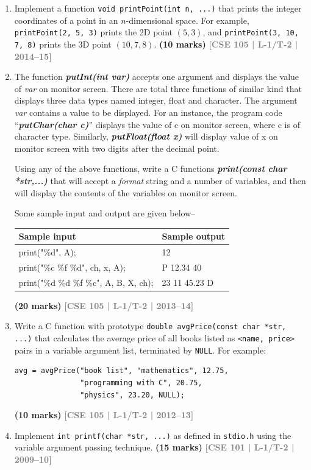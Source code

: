 \documentclass[12pt,a3paper]{article}
\newcommand{\yr}[1]{\hfill\textcolor{gray}{\small\textbf{[#1]}}}
\newcommand{\mk}[1]{\textcolor{orange!70!black}{\small\textbf{(#1 marks)}}}
\begin{document}
\begin{enumerate}
\item Implement a function \texttt{void printPoint(int n, ...)} that prints the integer coordinates of a point in an $n$-dimensional space. For example, \texttt{printPoint(2, 5, 3)} prints the 2D point $(5,3)$, and \texttt{printPoint(3, 10, 7, 8)} prints the 3D point $(10,7,8)$.
\mk{10} \yr{CSE 105 | L-1/T-2 | 2014--15}

\item The function \textbf{\textit{putInt(int var)}} accepts one argument and displays the value of \textit{var} on monitor screen. There are total three functions of similar kind that displays three data types named integer, float and character. The argument \textit{var} contains a value to be displayed. For an instance, the program code ``\textbf{\textit{putChar(char c)}}'' displays the value of c on monitor screen, where c is of character type. Similarly, \textbf{\textit{putFloat(float x)}} will display value of x on monitor screen with two digits after the decimal point.

\noindent Using any of the above functions, write a C functions \textbf{\textit{print(const char *str,...)}} that will accept a \textit{format} string and a number of variables, and then will display the contents of the variables on monitor screen.

\vspace{0.3cm}
\noindent Some sample input and output are given below--

\begin{center}
\begin{tabular}{|l|l|}
\hline
\textbf{Sample input} & \textbf{Sample output} \\ \hline
print("\%d", A); & 12 \\ \hline
print("\%c \%f \%d", ch, x, A); & P 12.34 40 \\ \hline
print("\%d \%d \%f \%c", A, B, X, ch); & 23 11 45.23 D \\ \hline
\end{tabular}
\end{center} 

\mk{20} \yr{CSE 105 | L-1/T-2 | 2013--14}

\item Write a C function with prototype \texttt{double avgPrice(const char *str, ...)} that calculates the average price of all books listed as \texttt{<name, price>} pairs in a variable argument list, terminated by \texttt{NULL}. For example:
\begin{lstlisting}
avg = avgPrice("book list", "mathematics", 12.75,
               "programming with C", 20.75,
               "physics", 23.20, NULL);
\end{lstlisting}
\mk{10} \yr{CSE 105 | L-1/T-2 | 2012--13}

\item Implement \texttt{int printf(char *str, ...)} as defined in \texttt{stdio.h} using the variable argument passing technique.
\mk{15} \yr{CSE 101 | L-1/T-2 | 2009--10}

\end{enumerate}
\end{document}
